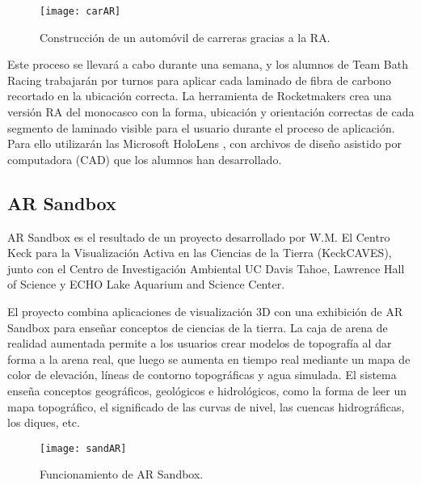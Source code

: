 \begin{figure}[h]
    \centering
    \texttt{[image: carAR]}
    \caption{Construcción de un automóvil de carreras gracias a la RA.}
    \label{fig:xyz}
\end{figure}    

Este proceso se llevará a cabo durante una semana, y los alumnos de Team Bath Racing trabajarán por turnos para aplicar cada laminado de fibra de carbono recortado en la ubicación correcta. La herramienta de Rocketmakers crea una versión RA del monocasco con la forma, ubicación y orientación correctas de cada segmento de laminado visible para el usuario durante el proceso de aplicación. Para ello utilizarán las Microsoft HoloLens \cite{URL::hololens}, con archivos de diseño asistido por computadora (CAD) que los alumnos han desarrollado.

 

\subsection{AR Sandbox} 
AR Sandbox \cite{URL::sandbox} es el resultado de un proyecto desarrollado por W.M. El Centro Keck para la Visualización Activa en las Ciencias de la Tierra (KeckCAVES), junto con el Centro de Investigación Ambiental UC Davis Tahoe, Lawrence Hall of Science y ECHO Lake Aquarium and Science Center.

El proyecto combina aplicaciones de visualización 3D con una exhibición de AR Sandbox para enseñar conceptos de ciencias de la tierra. La caja de arena de realidad aumentada  permite a los usuarios crear modelos de topografía al dar forma a la arena real, que luego se aumenta en tiempo real mediante un mapa de color de elevación, líneas de contorno topográficas y agua simulada. El sistema enseña conceptos geográficos, geológicos e hidrológicos, como la forma de leer un mapa topográfico, el significado de las curvas de nivel, las cuencas hidrográficas, los diques, etc.

\begin{figure}[h]
    \centering
    \texttt{[image: sandAR]}
    \caption{Funcionamiento de AR Sandbox.}
    \label{fig:xyz}
\end{figure}    







